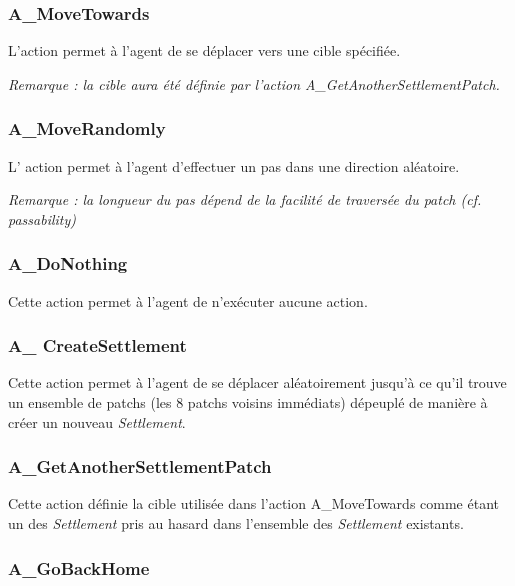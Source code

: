 	\subsubsection{A\_MoveTowards}  
	
	L'action permet à l'agent de se déplacer vers une cible spécifiée.
	
	\textit{Remarque : la cible aura été définie par l'action A\_GetAnotherSettlementPatch.}
	 	
 	
 	\subsubsection{A\_MoveRandomly} 
	
	L' action permet à l'agent d'effectuer un pas  dans une direction aléatoire.

\textit{Remarque : la longueur du pas dépend de la facilité de traversée du patch (cf. passability)}

	\subsubsection{A\_DoNothing}
	
	Cette action permet à l'agent de n'exécuter aucune action.
	
	\subsubsection{A\_ CreateSettlement}   
	
	Cette action permet à l'agent de se déplacer aléatoirement jusqu'à ce qu'il trouve un ensemble de patchs (les 8 patchs voisins immédiats)  dépeuplé de manière à créer un nouveau \textit{Settlement}.
	
	
	
	
	\subsubsection{A\_GetAnotherSettlementPatch}  
	
	Cette action définie la cible utilisée dans l'action A\_MoveTowards comme étant un des \textit{Settlement} pris au hasard dans l'ensemble des \textit{Settlement} existants.
	
	\subsubsection{A\_GoBackHome}
	
